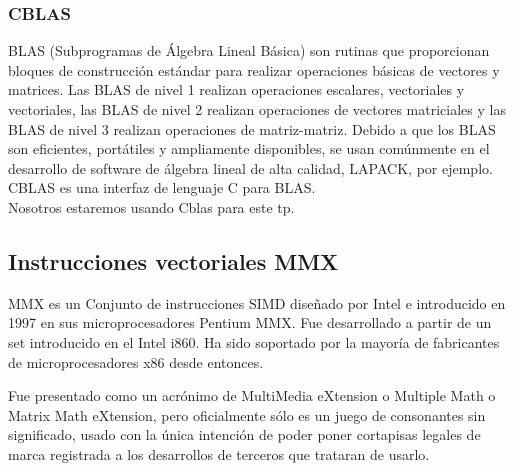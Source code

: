     \subsubsection{CBLAS}
        BLAS (Subprogramas de Álgebra Lineal Básica) son rutinas que proporcionan
        bloques de construcción estándar para realizar operaciones básicas de
        vectores y matrices. Las BLAS de nivel 1 realizan operaciones escalares,
        vectoriales y vectoriales, las BLAS de nivel 2 realizan operaciones de
        vectores matriciales y las BLAS de nivel 3 realizan operaciones
        de matriz-matriz. Debido a que los BLAS son eficientes, portátiles y
        ampliamente disponibles, se usan comúnmente en el desarrollo de software
        de álgebra lineal de alta calidad, LAPACK, por ejemplo.\\
        CBLAS es una interfaz de lenguaje C para BLAS.\\
        Nosotros estaremos usando Cblas para este tp.

\subsection{Instrucciones vectoriales MMX}
    MMX es un Conjunto de instrucciones SIMD diseñado por Intel e introducido en
    1997 en sus microprocesadores Pentium MMX. Fue desarrollado a partir de un
    set introducido en el Intel i860. Ha sido soportado por la mayoría de
    fabricantes de microprocesadores x86 desde entonces.

    Fue presentado como un acrónimo de MultiMedia eXtension o Multiple Math o
    Matrix Math eXtension, pero oficialmente sólo es un juego de consonantes
    sin significado, usado con la única intención de poder poner cortapisas
    legales de marca registrada a los desarrollos de terceros que trataran de
    usarlo.
